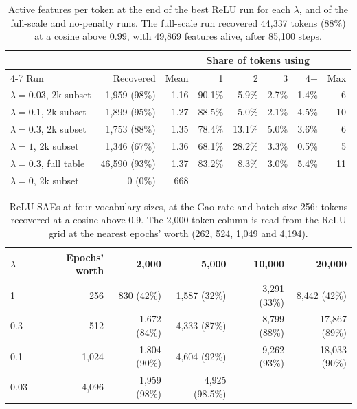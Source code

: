 \documentclass[11pt]{article}
\begin{document}
\begin{table}[h]
\centering
\small
\begin{tabular}{lrrrrrrr}
\toprule
& & & \multicolumn{4}{c}{Share of tokens using} & \\
\cmidrule(lr){4-7}
Run & Recovered & Mean & 1 & 2 & 3 & 4+ & Max \\
\midrule
$\lambda = 0.03$, 2k subset & 1,959 (98\%) & 1.16 & 90.1\% & 5.9\% & 2.7\% & 1.4\% & 6 \\
$\lambda = 0.1$, 2k subset & 1,899 (95\%) & 1.27 & 88.5\% & 5.0\% & 2.1\% & 4.5\% & 10 \\
$\lambda = 0.3$, 2k subset & 1,753 (88\%) & 1.35 & 78.4\% & 13.1\% & 5.0\% & 3.6\% & 6 \\
$\lambda = 1$, 2k subset & 1,346 (67\%) & 1.36 & 68.1\% & 28.2\% & 3.3\% & 0.5\% & 5 \\
$\lambda = 0.3$, full table & 46,590 (93\%) & 1.37 & 83.2\% & 8.3\% & 3.0\% & 5.4\% & 11 \\
$\lambda = 0$, 2k subset & 0 (0\%) & 668 & & & & & \\
\bottomrule
\end{tabular}
\caption{Active features per token at the end of the best ReLU run for each $\lambda$, and of the full-scale and no-penalty runs. The full-scale run recovered 44,337 tokens (88\%) at a cosine above 0.99, with 49,869 features alive, after 85,100 steps.}
\label{tab:relu-best}
\end{table}

\begin{table}[h]
\centering
\small
\begin{tabular}{lrrrrr}
\toprule
$\lambda$ & Epochs' worth & 2,000 & 5,000 & 10,000 & 20,000 \\
\midrule
1 & 256 & 830 (42\%) & 1,587 (32\%) & 3,291 (33\%) & 8,442 (42\%) \\
0.3 & 512 & 1,672 (84\%) & 4,333 (87\%) & 8,799 (88\%) & 17,867 (89\%) \\
0.1 & 1,024 & 1,804 (90\%) & 4,604 (92\%) & 9,262 (93\%) & 18,033 (90\%) \\
0.03 & 4,096 & 1,959 (98\%) & 4,925 (98.5\%) & & \\
\bottomrule
\end{tabular}
\caption{ReLU SAEs at four vocabulary sizes, at the Gao rate and batch size 256: tokens recovered at a cosine above 0.9. The 2,000-token column is read from the ReLU grid at the nearest epochs' worth (262, 524, 1,049 and 4,194).}
\label{tab:relu-sizes}
\end{table}
\end{document}
